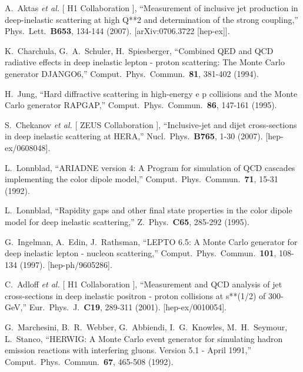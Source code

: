 \documentclass[11pt]{article}
\begin{document}
\begin{thebibliography}{99}
  A.~Aktas {\it et al.} [ H1 Collaboration ],
  ``Measurement of inclusive jet production in deep-inelastic scattering at high Q**2 and determination of the strong coupling,''
  Phys.\ Lett.\  {\bf B653}, 134-144 (2007).
  [arXiv:0706.3722 [hep-ex]].


  K.~Charchula, G.~A.~Schuler, H.~Spiesberger,
  ``Combined QED and QCD radiative effects in deep inelastic lepton - proton scattering: The Monte Carlo generator DJANGO6,''
  Comput.\ Phys.\ Commun.\  {\bf 81}, 381-402 (1994).
  
  H.~Jung,
  ``Hard diffractive scattering in high-energy e p collisions and the Monte Carlo generator RAPGAP,''
  Comput.\ Phys.\ Commun.\  {\bf 86}, 147-161 (1995).
  




  S.~Chekanov {\it et al.} [ ZEUS Collaboration ],
  ``Inclusive-jet and dijet cross-sections in deep inelastic scattering at HERA,''
  Nucl.\ Phys.\  {\bf B765}, 1-30 (2007).
  [hep-ex/0608048].




  L.~Lonnblad,
  ``ARIADNE version 4: A Program for simulation of QCD cascades implementing the color dipole model,''
  Comput.\ Phys.\ Commun.\  {\bf 71}, 15-31 (1992).
  
  L.~Lonnblad,
  ``Rapidity gaps and other final state properties in the color dipole model for deep inelastic scattering,''
  Z.\ Phys.\  {\bf C65}, 285-292 (1995).
  

  G.~Ingelman, A.~Edin, J.~Rathsman,
  ``LEPTO 6.5: A Monte Carlo generator for deep inelastic lepton - nucleon scattering,''
  Comput.\ Phys.\ Commun.\  {\bf 101}, 108-134 (1997).
  [hep-ph/9605286].


  C.~Adloff {\it et al.} [ H1 Collaboration ],
  ``Measurement and QCD analysis of jet cross-sections in deep inelastic positron - proton collisions at s**(1/2) of 300-GeV,''
  Eur.\ Phys.\ J.\  {\bf C19}, 289-311 (2001).
  [hep-ex/0010054].

  G.~Marchesini, B.~R.~Webber, G.~Abbiendi, I.~G.~Knowles, M.~H.~Seymour, L.~Stanco,
  ``HERWIG: A Monte Carlo event generator for simulating hadron emission reactions with interfering gluons. Version 5.1 - April 1991,''
  Comput.\ Phys.\ Commun.\  {\bf 67}, 465-508 (1992).
  


\end{thebibliography}
\end{document}
